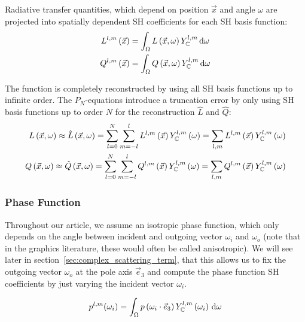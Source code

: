 \documentclass[10pt]{scrartcl}
\begin{document}
Radiative transfer quantities, which depend on position $\vec{x}$ and angle $\omega$ are projected into spatially dependent SH coefficients for each SH basis function:
\begin{align}
L^{l,m}\left(\vec{x}\right)
&=
\int_\Omega{L\left(\vec{x}, \omega\right)Y_{\mathbb{C}}^{l,m}\,\mathrm{d}\omega}\nonumber\\
Q^{l,m}\left(\vec{x}\right)
&=
\int_\Omega{Q\left(\vec{x}, \omega\right)Y_{\mathbb{C}}^{l,m}\,\mathrm{d}\omega}\nonumber
\end{align} 

The function is completely reconstructed by using all SH basis functions up to infinite order. The $P_N$-equations introduce a truncation error by only using SH basis functions up to order $N$ for the reconstruction $\hat{L}$ and $\hat{Q}$:
\begin{align}
\label{eq:sh_exp_L}
L\left(\vec{x}, \omega\right)
\approx
\hat{L}\left(\vec{x}, \omega\right) =
\sum_{l=0}^{N}
{
\sum_{m=-l}^{l}
{
L^{l,m}\left(\vec{x}\right)Y_{\mathbb{C}}^{l,m}\left(\omega\right)
}
}
=
\sum_{l,m}
{
L^{l,m}\left(\vec{x}\right)Y_{\mathbb{C}}^{l,m}\left(\omega\right)
}\nonumber\\
Q\left(\vec{x}, \omega\right)
\approx
\hat{Q}\left(\vec{x}, \omega\right) =
\sum_{l=0}^{N}
{
\sum_{m=-l}^{l}
{
Q^{l,m}\left(\vec{x}\right)Y_{\mathbb{C}}^{l,m}\left(\omega\right)
}
}
=
\sum_{l,m}
{
Q^{l,m}\left(\vec{x}\right)Y_{\mathbb{C}}^{l,m}\left(\omega\right)
}
\end{align}

\subsubsection{Phase Function}
\label{sec:complex_proj_phase}

Throughout our article, we assume an isotropic phase function, which only depends on the angle between incident and outgoing vector $\omega_i$ and $\omega_o$ (note that in the graphics literature, these would often be called anisotropic). We will see later in section~\ref{sec:complex_scattering_term}, that this allows us to fix the outgoing vector $\omega_o$ at the pole axis $\vec{e}_3$ and compute the phase function SH coefficients by just varying the incident vector $\omega_i$.

\begin{align*}
p^{l,m}(\omega_i)
=
\int_\Omega
{
p\left(\omega_i\cdot\vec{e}_3\right)
Y_{\mathbb{C}}^{l,m}\left(\omega_i\right)
\,\mathrm{d}\omega
}
\nonumber
\end{align*}
\end{document}

